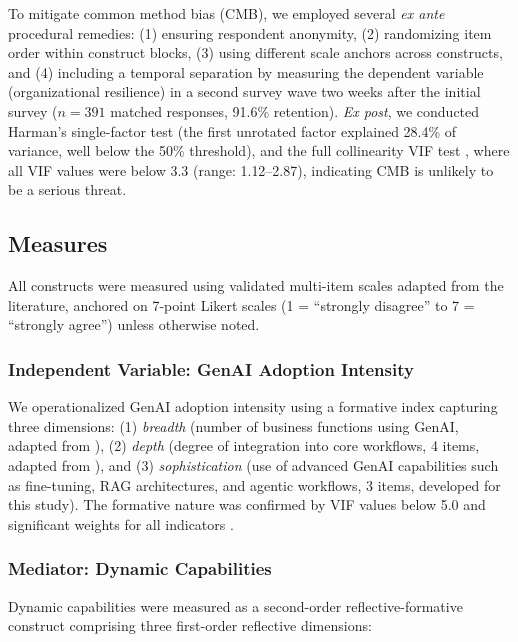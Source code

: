 \documentclass[12pt, a4paper]{article}
\begin{document}
To mitigate common method bias (CMB), we employed several \textit{ex ante} procedural remedies: (1) ensuring respondent anonymity, (2) randomizing item order within construct blocks, (3) using different scale anchors across constructs, and (4) including a temporal separation by measuring the dependent variable (organizational resilience) in a second survey wave two weeks after the initial survey ($n = 391$ matched responses, 91.6\% retention). \textit{Ex post}, we conducted Harman's single-factor test (the first unrotated factor explained 28.4\% of variance, well below the 50\% threshold), and the full collinearity VIF test \citep{Kock2015}, where all VIF values were below 3.3 (range: 1.12--2.87), indicating CMB is unlikely to be a serious threat.

\subsection{Measures}

All constructs were measured using validated multi-item scales adapted from the literature, anchored on 7-point Likert scales (1 = ``strongly disagree'' to 7 = ``strongly agree'') unless otherwise noted.

\subsubsection{Independent Variable: GenAI Adoption Intensity}

We operationalized GenAI adoption intensity using a formative index capturing three dimensions: (1) \textit{breadth} (number of business functions using GenAI, adapted from \citealt{Zhu2006}), (2) \textit{depth} (degree of integration into core workflows, 4 items, adapted from \citealt{Chatterjee2021}), and (3) \textit{sophistication} (use of advanced GenAI capabilities such as fine-tuning, RAG architectures, and agentic workflows, 3 items, developed for this study). The formative nature was confirmed by VIF values below 5.0 and significant weights for all indicators \citep{Hair2017}.

\subsubsection{Mediator: Dynamic Capabilities}

Dynamic capabilities were measured as a second-order reflective-formative construct comprising three first-order reflective dimensions:
\end{document}
